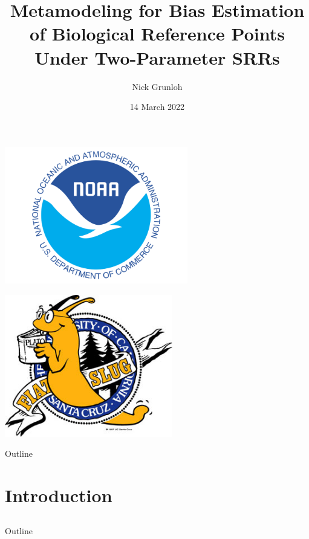 \documentclass[ xcolor = pdftex, dvipsnames, table ]{beamer}
\title{Metamodeling for Bias Estimation of Biological Reference Points Under Two-Parameter SRRs}
\author{
Nick Grunloh
}
\date{14 March 2022}
\begin{document}
%
\begin{frame}
\titlepage
\vspace*{-3cm}
\begin{minipage}[h!]{0.49\textwidth}
\hspace*{-0.25cm}
\includegraphics[width=0.6\textwidth]{noaaText.png}
\end{minipage}
\begin{minipage}[h!]{0.49\textwidth}
\hspace*{2cm}
\includegraphics[width=0.55\textwidth]{slug.jpg}
\end{minipage}
\end{frame}

%
\begin{frame}{Outline}
    \tableofcontents
\end{frame}

%
\section{Introduction}
\subsection{}
\begin{frame}{Outline} 
\end{frame}
\end{document}
